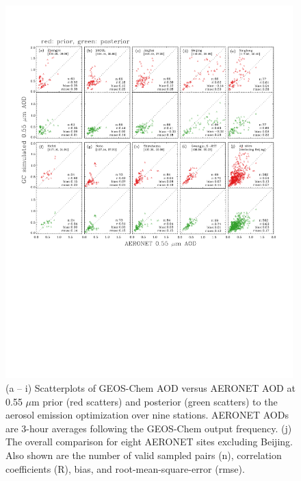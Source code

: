  \begin{figure}[t]
  \centering
  \includegraphics[width={0.99\textwidth}]{figures/a6.pdf}  
  \caption{(a – i) Scatterplots of GEOS-Chem AOD versus AERONET AOD at 0.55 $\mu$m prior (red scatters) and posterior (green scatters) to the aerosol emission optimization over nine stations. AERONET AODs are 3-hour averages following the GEOS-Chem output frequency. (j) The overall comparison for eight AERONET sites excluding Beijing. Also shown are the number of valid sampled pairs (n), correlation coefficients (R), bias, and root-mean-square-error (rmse).}
  \label{fig:aeronet}
 \end{figure}

